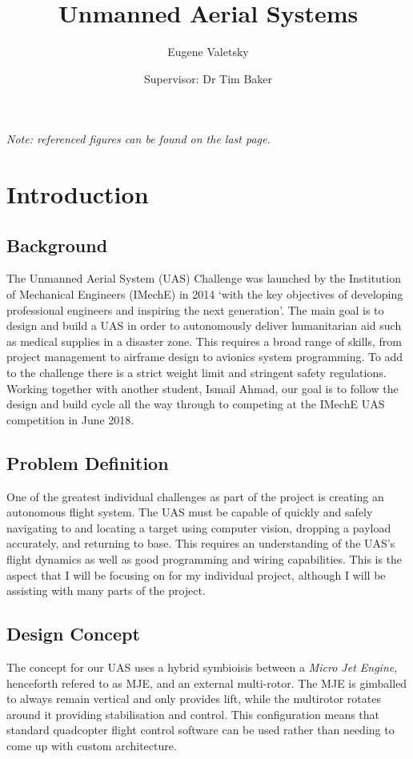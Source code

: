 \documentclass[11pt]{article}
\title{\vspace{-4em}Unmanned Aerial Systems}
\author{Eugene Valetsky\\ \and Supervisor: Dr Tim Baker}
\date{}
\begin{document}
\maketitle

\emph{Note: referenced figures can be found on the last page.}
\section{Introduction}
\subsection{Background}
The Unmanned Aerial System (UAS) Challenge was launched by the Institution of Mechanical Engineers (IMechE) in 2014 `with the key objectives of developing professional engineers and inspiring the next generation'\cite{IMechE_about_uas}. The main goal is to design and build a UAS in order to autonomously deliver humanitarian aid such as medical supplies in a disaster zone. This requires a broad range of skills, from project management to airframe design to avionics system programming. To add to the challenge there is a strict weight limit and stringent safety regulations. Working together with another student, Ismail Ahmad, our goal is to follow the design and build cycle all the way through to competing at the IMechE UAS competition in June 2018.

\subsection{Problem Definition}
One of the greatest individual challenges as part of the project is creating an autonomous flight system. The UAS must be capable of quickly and safely navigating to and locating a target using computer vision, dropping a payload accurately, and returning to base. This requires an understanding of the UAS’s flight dynamics as well as good programming and wiring capabilities. This is the aspect that I will be focusing on for my individual project, although I will be assisting with many parts of the project.

\subsection{Design Concept}
The concept for our UAS uses a hybrid symbioisis between a \emph{Micro Jet Engine}, henceforth refered to as MJE, and an external multi-rotor. The MJE is gimballed to always remain vertical and only provides lift, while the multirotor rotates around it providing stabilisation and control. This configuration means that standard quadcopter flight control software can be used rather than needing to come up with custom architecture.
\end{document}
